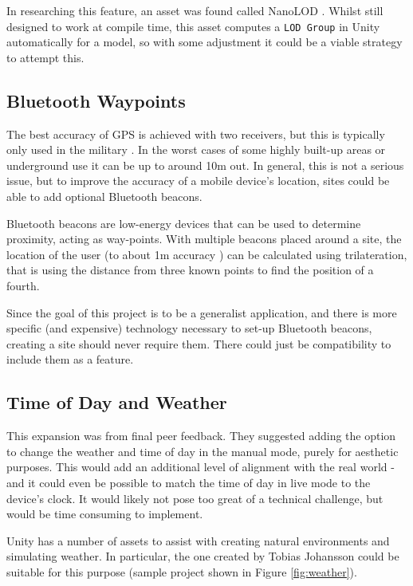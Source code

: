 \documentclass[12pt, a4paper]{article}
\begin{document}
In researching this feature, an asset was found called NanoLOD \cite{futurework:nanoLOD}. Whilst still designed to work at compile time, this asset computes a \verb|LOD Group| in Unity automatically for a model, so with some adjustment it could be a viable strategy to attempt this. 

\subsection{Bluetooth Waypoints}
The best accuracy of GPS is achieved with two receivers, but this is typically only used in the military \cite{futurework:gpsaccuracy}. In the worst cases of some highly built-up areas or underground use it can be up to around 10m out. In general, this is not a serious issue, but to improve the accuracy of a mobile device's location, sites could be able to add optional Bluetooth beacons. 

Bluetooth beacons are low-energy devices that can be used to determine proximity, acting as way-points. With multiple beacons placed around a site, the location of the user (to about 1m accuracy \cite{futurework:beaconaccuracy}) can be calculated using trilateration, that is using the distance from three known points to find the position of a fourth.

Since the goal of this project is to be a generalist application, and there is more specific (and expensive) technology necessary to set-up Bluetooth beacons, creating a site should never require them. There could just be compatibility to include them as a feature.

\subsection{Time of Day and Weather}
This expansion was from final peer feedback. They suggested adding the option to change the weather and time of day in the manual mode, purely for aesthetic purposes. This would add an additional level of alignment with the real world - and it could even be possible to match the time of day in live mode to the device's clock. It would likely not pose too great of a technical challenge, but would be time consuming to implement.

Unity has a number of assets to assist with creating natural environments and simulating weather. In particular, the one created by Tobias Johansson could be suitable for this purpose \cite{futurework:weather} (sample project shown in Figure \ref{fig:weather}).
\end{document}
